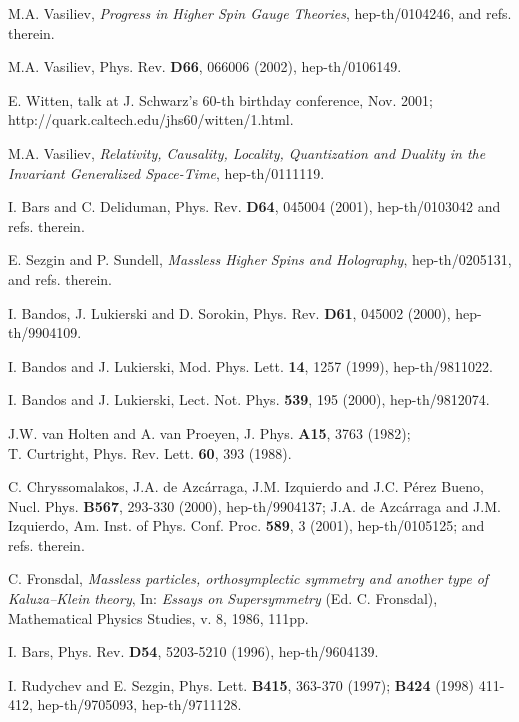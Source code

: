 \documentclass[a4paper,11pt]{article}
\begin{document}
{\small 
\begin{thebibliography}{99}


 M.A. Vasiliev, {\sl Progress in Higher Spin Gauge Theories}, hep-th/0104246, 
and refs. therein. 

M.A. Vasiliev, 
Phys. Rev. {\bf D66}, 066006 (2002),  hep-th/0106149. 

E. Witten, talk at J. Schwarz's 60-th birthday conference, 
Nov. 2001;  http://quark.caltech.edu/jhs60/witten/1.html. 


M.A. Vasiliev, {\sl Relativity, Causality, Locality, 
Quantization and Duality in the \coordHE{} 
Invariant Generalized Space-Time}, hep-th/0111119.  

 I. Bars and C. Deliduman, 
Phys. Rev. {\bf D64}, 045004 (2001), hep-th/0103042 and refs. therein. 

 E. Sezgin and P. Sundell, {\sl Massless Higher Spins and Holography}, 
hep-th/0205131, and refs. therein. 

I. Bandos, J. Lukierski and D. Sorokin, Phys. Rev. {\bf D61},
045002 (2000), hep-th/9904109.

I. Bandos and J. Lukierski, Mod. Phys. Lett. {\bf 14}, 1257 (1999),
hep-th/9811022. 

I. Bandos and J. Lukierski,
Lect. Not. Phys. {\bf 539}, 195 
(2000), hep-th/9812074.

J.W. van Holten and A. van Proeyen, J. Phys. {\bf A15}, 3763 
(1982); \\ 
T. Curtright, Phys. Rev. Lett. {\bf 60}, 393 (1988).

 C. Chryssomalakos, J.A. de Azc\'{a}rraga, J.M. Izquierdo and 
J.C. P\'{e}rez Bueno, Nucl. Phys. {\bf B567}, 293-330 (2000),  
hep-th/9904137; J.A. de Azc\'{a}rraga and J.M. Izquierdo, 
Am. Inst. of Phys. Conf. Proc. {\bf 589}, 3 (2001), hep-th/0105125;  
and refs. therein. 

C. Fronsdal, {\sl Massless particles, orthosymplectic symmetry 
and another type of Kaluza--Klein theory}, 
In: {\it Essays on Supersymmetry} (Ed. C. Fronsdal), 
Mathematical Physics Studies, v. 8, 1986, 111pp.


I. Bars, 
Phys. Rev. {\bf D54},  
5203-5210 (1996), hep-th/9604139. 


I. Rudychev and E. Sezgin, 
Phys. Lett. {\bf B415},  
363-370 (1997); {\bf B424} (1998) 411-412, 
hep-th/9705093, 
 hep-th/9711128. 


\end{thebibliography}}
\end{document}
